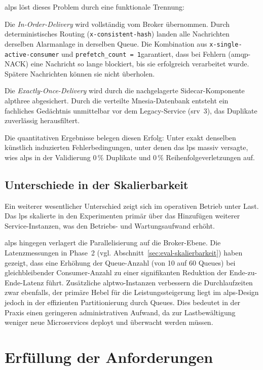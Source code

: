 \gls{alps} löst dieses Problem durch eine funktionale Trennung:

Die \textit{In-Order-Delivery} wird vollständig vom Broker übernommen. Durch deterministisches Routing (\texttt{x-consistent-hash}) landen alle Nachrichten derselben Alarmanlage in derselben Queue. Die Kombination aus \texttt{x-single-active-consumer} und \texttt{prefetch\_count = 1}garantiert, dass bei Fehlern (\gls{amqp}-NACK) eine Nachricht so lange blockiert, bis sie erfolgreich verarbeitet wurde. Spätere Nachrichten können sie nicht überholen.

Die \textit{Exactly-Once-Delivery} wird durch die nachgelagerte Sidecar-Komponente \gls{alpthree} abgesichert. Durch die verteilte Mnesia-Datenbank entsteht ein fachliches Gedächtnis unmittelbar vor dem Legacy-Service (\gls{srv}~3), das Duplikate zuverlässig herausfiltert.

Die quantitativen Ergebnisse belegen diesen Erfolg: Unter exakt denselben künstlich induzierten Fehlerbedingungen, unter denen das \gls{lps} massiv versagte, wies \gls{alps} in der Validierung $0\,\%$ Duplikate und $0\,\%$ Reihenfolgeverletzungen auf.

\subsection{Unterschiede in der Skalierbarkeit}
Ein weiterer wesentlicher Unterschied zeigt sich im operativen Betrieb unter Last. Das \gls{lps} skalierte in den Experimenten primär über das Hinzufügen weiterer Service-Instanzen, was den Betriebs- und Wartungsaufwand erhöht.

\gls{alps} hingegen verlagert die Parallelisierung auf die Broker-Ebene. Die Latenzmessungen in Phase~2 (vgl. Abschnitt~\ref{sec:eval-skalierbarkeit}) haben gezeigt, dass eine Erhöhung der Queue-Anzahl (von 10 auf 60 Queues) bei gleichbleibender Consumer-Anzahl zu einer signifikanten Reduktion der Ende-zu-Ende-Latenz führt. Zusätzliche \gls{alptwo}-Instanzen verbessern die Durchlaufzeiten zwar ebenfalls, der primäre Hebel für die Leistungssteigerung liegt im \gls{alps}-Design jedoch in der effizienten Partitionierung durch Queues. Dies bedeutet in der Praxis einen geringeren administrativen Aufwand, da zur Lastbewältigung weniger neue Microservices deployt und überwacht werden müssen.

\section{Erfüllung der Anforderungen}

